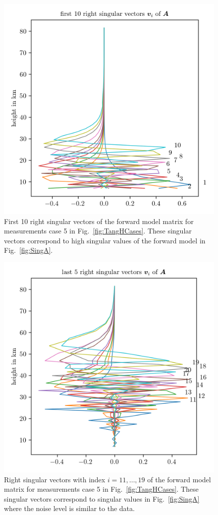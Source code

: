 \begin{figure}[ht!]
	\centering
	\includegraphics{SingVecA.png}
	\caption[First 10 right singular vectors of forward model.]{First 10 right singular vectors of the forward model matrix for measurements case 5 in Fig.~\ref{fig:TangHCases}. These singular vectors correspond to high singular values of the forward model in Fig.~\ref{fig:SingA}.}
	\label{fig:SingVecA}
\end{figure}
\begin{figure}[ht!]
	\centering
	\includegraphics{MiddleVecA.png}
	\caption[Right singular vectors 11 to 19 of forward model.]{Right singular vectors with index $i = 11,\dots, 19$ of the forward model matrix for measurements case 5 in Fig.~\ref{fig:TangHCases}.
		These singular vectors correspond to singular values in Fig.~\ref{fig:SingA} where the noise level is similar to the data.}
	\label{fig:middleSpace}
\end{figure}
